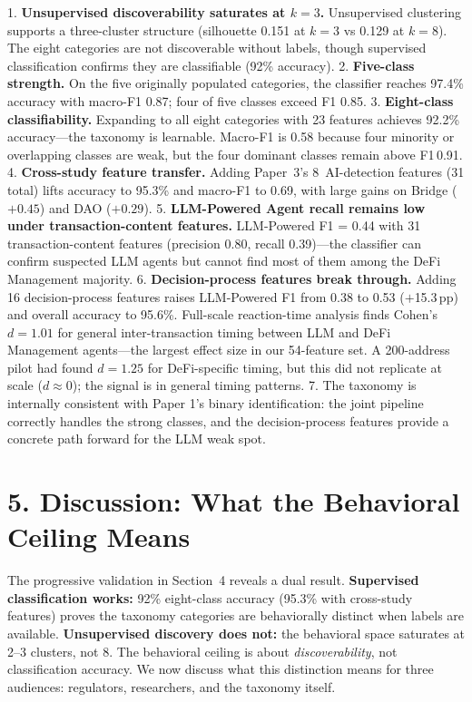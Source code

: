 \documentclass[sigconf,nonacm=false]{acmart}
\begin{document}
1. \textbf{Unsupervised discoverability saturates at $k{=}3$.} Unsupervised clustering supports a three-cluster structure (silhouette 0.151 at $k=3$ vs 0.129 at $k=8$). The eight categories are not discoverable without labels, though supervised classification confirms they are classifiable (92\% accuracy).
2. \textbf{Five-class strength.} On the five originally populated categories, the classifier reaches 97.4\% accuracy with macro-F1 0.87; four of five classes exceed F1 0.85.
3. \textbf{Eight-class classifiability.} Expanding to all eight categories with 23 features achieves 92.2\% accuracy---the taxonomy is learnable. Macro-F1 is 0.58 because four minority or overlapping classes are weak, but the four dominant classes remain above F1\,0.91.
4. \textbf{Cross-study feature transfer.} Adding Paper~3's 8~AI-detection features (31 total) lifts accuracy to 95.3\% and macro-F1 to 0.69, with large gains on Bridge ($+0.45$) and DAO ($+0.29$).
5. \textbf{LLM-Powered Agent recall remains low under transaction-content features.} LLM-Powered F1 = 0.44 with 31 transaction-content features (precision 0.80, recall 0.39)---the classifier can confirm suspected LLM agents but cannot find most of them among the DeFi Management majority.
6. \textbf{Decision-process features break through.} Adding 16 decision-process features raises LLM-Powered F1 from 0.38 to 0.53 ($+$15.3\,pp) and overall accuracy to 95.6\%. Full-scale reaction-time analysis finds Cohen's $d{=}1.01$ for general inter-transaction timing between LLM and DeFi Management agents---the largest effect size in our 54-feature set. A 200-address pilot had found $d{=}1.25$ for DeFi-specific timing, but this did not replicate at scale ($d{\approx}0$); the signal is in general timing patterns.
7. The taxonomy is internally consistent with Paper 1's binary identification: the joint pipeline correctly handles the strong classes, and the decision-process features provide a concrete path forward for the LLM weak spot.



\section{5. Discussion: What the Behavioral Ceiling Means}

The progressive validation in Section~4 reveals a dual result. \textbf{Supervised classification works:} 92\% eight-class accuracy (95.3\% with cross-study features) proves the taxonomy categories are behaviorally distinct when labels are available. \textbf{Unsupervised discovery does not:} the behavioral space saturates at 2--3 clusters, not 8. The behavioral ceiling is about \emph{discoverability}, not classification accuracy. We now discuss what this distinction means for three audiences: regulators, researchers, and the taxonomy itself.
\end{document}
